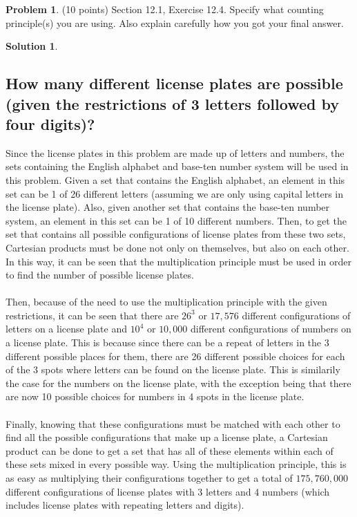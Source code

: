 \documentclass{article}
\theoremstyle{definition}
\newtheorem{problem}{Problem}
\newtheorem*{solution}{Solution}
\begin{document}
\newpage
\begin{problem} (10 points) Section 12.1, Exercise 12.4.  Specify what counting principle(s)
you are using.  Also explain carefully how you got your final answer.
\end{problem}
\begin{solution}
\hspace{1cm}
\subsection*{How many different license plates are possible (given the restrictions of 3 letters followed by four digits)?}
Since the license plates in this problem are made up of letters and numbers, the sets containing the English alphabet and base-ten number system will be used in this problem. Given a set that contains the English alphabet, an element in this set can be 1 of 26 different letters (assuming we are only using capital letters in the license plate). Also, given another set that contains the base-ten number system, an element in this set can be 1 of 10 different numbers. Then, to get the set that contains all possible configurations of license plates from these two sets, Cartesian products must be done not only on themselves, but also on each other. In this way, it can be seen that the multiplication principle must be used in order to find the number of possible license plates.\\\\
Then, because of the need to use the multiplication principle with the given restrictions, it can be seen that there are $26^3$ or $17,576$ different configurations of letters on a license plate and $10^4$ or $10,000$ different configurations of numbers on a license plate. This is because since there can be a repeat of letters in the 3 different possible places for them, there are 26 different possible choices for each of the 3 spots where letters can be found on the license plate. This is similarily the case for the numbers on the license plate, with the exception being that there are now 10 possible choices for numbers in 4 spots in the license plate.\\\\
Finally, knowing that these configurations must be matched with each other to find all the possible configurations that make up a license plate, a Cartesian product can be done to get a set that has all of these elements within each of these sets mixed in every possible way. Using the multiplication principle, this is as easy as multiplying their configurations together to get a total of $175,760,000$ different configurations of license plates with 3 letters and 4 numbers (which includes license plates with repeating letters and digits).
\end{solution}
\end{document}
